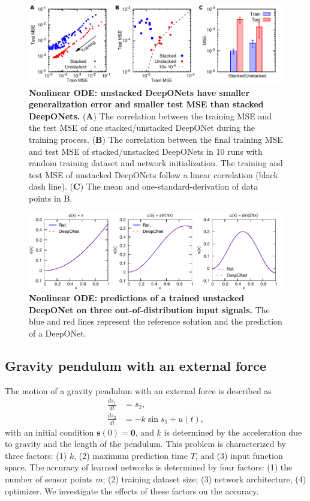 \documentclass[11pt]{article}
\begin{document}
\begin{figure}[htbp]
\centering
\includegraphics{ode_stacked.pdf}
\caption{\textbf{Nonlinear ODE: unstacked DeepONets have smaller generalization error and smaller test MSE than stacked DeepONets.} (\textbf{A}) The correlation between the training MSE and the test MSE of one stacked/unstacked DeepONet during the training process. (\textbf{B}) The correlation between the final training MSE and test MSE of stacked/unstacked DeepONets in 10 runs with random training dataset and network initialization. The training and test MSE of unstacked DeepONets follow a linear correlation (black dash line). (\textbf{C}) The mean and one-standard-derivation of data points in B.}
\label{fig:ode_stacked}
\end{figure}

\begin{figure}[htbp]
\centering
\includegraphics{ode_example.pdf}
\caption{\textbf{Nonlinear ODE: predictions of a trained unstacked DeepONet on three out-of-distribution input signals.} The blue and red lines represent the reference solution and the prediction of a DeepONet.}
\label{fig:ode_example}
\end{figure}

\subsection{Gravity pendulum with an external force}

The motion of a gravity pendulum with an external force is described as
\begin{align*}
\frac{ds_1}{dt} &= s_2, \\
\frac{ds_2}{dt} &= -k\sin s_1 + u(t),
\end{align*}
with an initial condition $\mathbf{s}(0) = \mathbf{0}$, and $k$ is determined by the acceleration due to gravity and the length of the pendulum. This problem is characterized by three factors: (1) $k$, (2) maximum prediction time $T$, and (3) input function space. The accuracy of learned networks is determined by four factors: (1) the number of sensor points $m$; (2) training dataset size; (3) network architecture, (4) optimizer. We investigate the effects of these factors on the accuracy.
\end{document}
